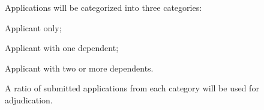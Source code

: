 \begin{longenum}[ label*=\thesubsection.\arabic*., align=left]
\begin{longenum}[ label*=\arabic*., align=left]
		\item Applications will be categorized into three categories:
			\begin{longenum}[ label*=\arabic*., align=left]
			\item Applicant only;			
			\item Applicant with one dependent;
			\item Applicant with two or more dependents.
			\end{longenum}		
		\item A ratio of submitted applications from each category will be used for adjudication.					
		\end{longenum}
\end{longenum} 